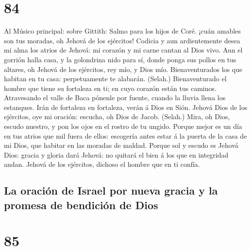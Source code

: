\hypertarget{section-83}{%
\section{84}\label{section-83}}

 Al Músico principal: sobre Gittith: Salmo para los hijos
de Coré. ¡cuán amables son tus moradas, oh Jehová de los ejércitos!
 Codicia y aun ardientemente desea mi alma los atrios de
Jehová: mi corazón y mi carne cantan al Dios vivo.  Aun el
gorrión halla casa, y la golondrina nido para sí, donde ponga sus pollos
en tus altares, oh Jehová de los ejércitos, rey mío, y Dios mío.
 Bienaventurados los que habitan en tu casa: perpetuamente
te alabarán. (Selah.)  Bienaventurado el hombre que tiene
su fortaleza en ti; en cuyo corazón están tus caminos. 
Atravesando el valle de Baca pónenle por fuente, cuando la lluvia llena
los estanques.  Irán de fortaleza en fortaleza, verán á
Dios en Sión.  Jehová Dios de los ejércitos, oye mi
oración: escucha, oh Dios de Jacob. (Selah.)  Mira, oh
Dios, escudo nuestro, y pon los ojos en el rostro de tu ungido.
 Porque mejor es un día en tus atrios que mil fuera de
ellos: escogería antes estar á la puerta de la casa de mi Dios, que
habitar en las moradas de maldad.  Porque sol y escudo es
Jehová Dios: gracia y gloria dará Jehová: no quitará el bien á los que
en integridad andan.  Jehová de los ejércitos, dichoso el
hombre que en ti confía.

\hypertarget{la-oraciuxf3n-de-israel-por-nueva-gracia-y-la-promesa-de-bendiciuxf3n-de-dios}{%
\subsection{La oración de Israel por nueva gracia y la promesa de
bendición de
Dios}\label{la-oraciuxf3n-de-israel-por-nueva-gracia-y-la-promesa-de-bendiciuxf3n-de-dios}}

\hypertarget{section-84}{%
\section{85}\label{section-84}}

